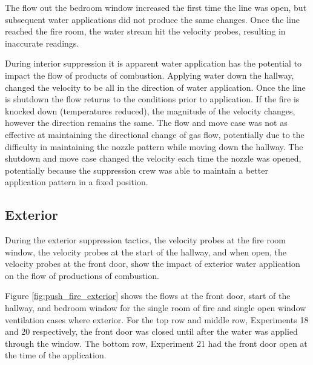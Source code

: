 \documentclass[12pt,oneside]{book}
\begin{document}
The flow out the bedroom window increased the first time the line was open, but subsequent water applications did not produce the same changes. Once the line reached the fire room, the water stream hit the velocity probes, resulting in inaccurate readings. 

During interior suppression it is apparent water application has the potential to impact the flow of products of combustion. Applying water down the hallway, changed the velocity to be all in the direction of water application. Once the line is shutdown the flow returns to the conditions prior to application. If the fire is knocked down (temperatures reduced), the magnitude of the velocity changes, however the direction remains the same. The flow and move case was not as effective at maintaining the directional change of gas flow, potentially due to the difficulty in maintaining the nozzle pattern while moving down the hallway. The shutdown and move case changed the velocity each time the nozzle was opened, potentially because the suppression crew was able to maintain a better application pattern in a fixed position.

\subsection{Exterior}
During the exterior suppression tactics, the velocity probes at the fire room window, the velocity probes at the start of the hallway, and when open, the velocity probes at the front door, show the impact of exterior water application on the flow of productions of combustion. 

Figure \ref{fig:push_fire_exterior} shows the flows at the front door, start of the hallway, and bedroom window for the single room of fire and single open window ventilation cases where exterior. For the top row and middle row, Experiments 18 and 20 respectively, the front door was closed until after the water was applied through the window. The bottom row, Experiment 21 had the front door open at the time of the application. 
\end{document}
